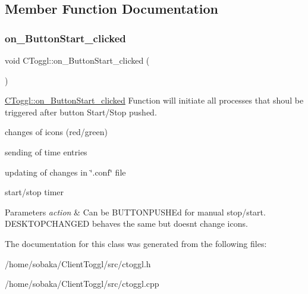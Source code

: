 \subsection{Member Function Documentation}
\mbox{\label{classCToggl_a110c1e91012e0ce77c4d5df0b8dad9f1}} 
\subsubsection{\texorpdfstring{on\+\_\+\+Button\+Start\+\_\+clicked}{on\_ButtonStart\_clicked}}
{\footnotesize\ttfamily void C\+Toggl\+::on\+\_\+\+Button\+Start\+\_\+clicked (\begin{DoxyParamCaption}{ }\end{DoxyParamCaption})\hspace{0.3cm}{\ttfamily [slot]}}



\hyperlink{classCToggl_a110c1e91012e0ce77c4d5df0b8dad9f1}{C\+Toggl\+::on\+\_\+\+Button\+Start\+\_\+clicked} Function will initiate all processes that shoul be triggered after button Start/\+Stop pushed. 


\begin{DoxyItemize}
\item changes of icons (red/green)
\item sending of time entries
\item updating of changes in \char`\"{}.\+conf\char`\"{} file
\item start/stop timer 
\begin{DoxyParams}{Parameters}
{\em action} & Can be B\+U\+T\+T\+O\+N\+P\+U\+S\+H\+Ed for manual stop/start. D\+E\+S\+K\+T\+O\+P\+C\+H\+A\+N\+G\+ED behaves the same but doesn\textquotesingle{}t change icons. \\
\hline
\end{DoxyParams}

\end{DoxyItemize}

The documentation for this class was generated from the following files\+:\begin{DoxyCompactItemize}
\item 
/home/sobaka/\+Client\+Toggl/src/ctoggl.\+h\item 
/home/sobaka/\+Client\+Toggl/src/ctoggl.\+cpp\end{DoxyCompactItemize}
